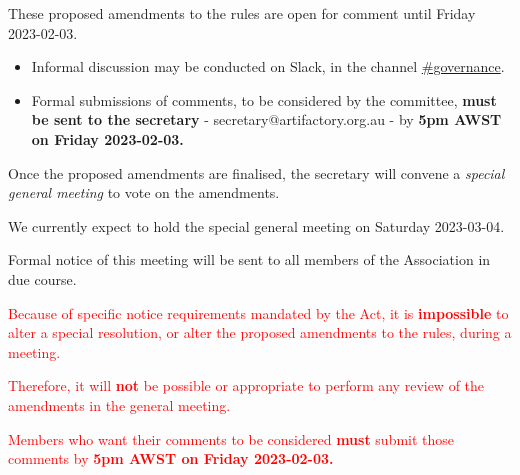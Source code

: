 \documentclass[../constitution.tex]{subfiles}
\begin{document}
These proposed amendments to the rules are open for comment until Friday 2023-02-03.

\begin{itemize}
    \item Informal discussion may be conducted on Slack, in the channel \href{https://perthartifactory.slack.com/archives/C04GDNBFGN5}{\#governance}.
    \item Formal submissions of comments, to be considered by the committee, \textbf{must be sent to the secretary} - secretary@artifactory.org.au - by \textbf{5pm AWST on Friday 2023-02-03.}
\end{itemize}

\bigskip

Once the proposed amendments are finalised, the secretary will convene a \textit{special general meeting} to vote on the amendments.

We currently expect to hold the special general meeting on Saturday 2023-03-04.

Formal notice of this meeting will be sent to all members of the Association in due course.


\bigskip

\large

\textcolor{red}{Because of specific notice requirements mandated by the Act, it is \textbf{impossible} to alter a special resolution, or alter the proposed amendments to the rules, during a meeting.}

\textcolor{red}{Therefore, it will \textbf{not} be possible or appropriate to perform any review of the amendments in the general meeting.}

\textcolor{red}{Members who want their comments to be considered \textbf{must} submit those comments by \textbf{5pm AWST on Friday 2023-02-03.}}
\end{document}
